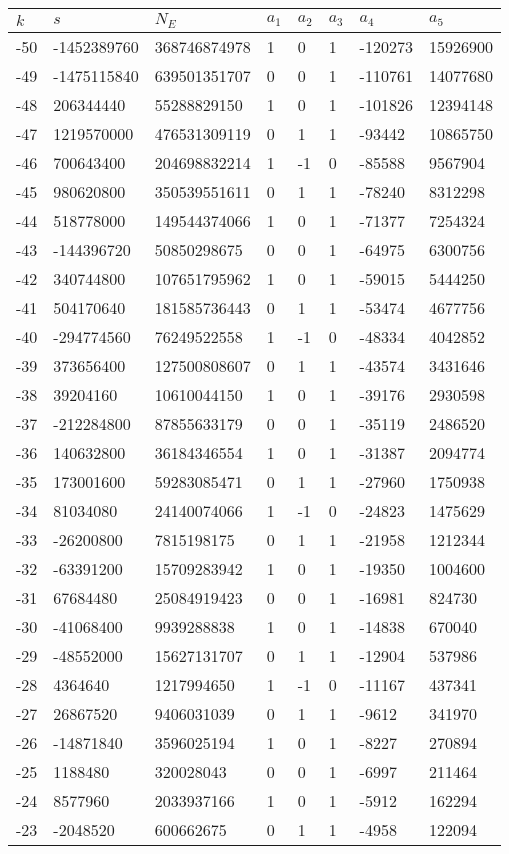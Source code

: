 \documentclass{amsart}
\begin{document}
\begin{longtable}{|l|l|l|lllll|}
\hline
$k$ & $s$ & $N_E$ & $a_1$ & $a_2$ & $a_3$ & $a_4$ & $a_5$\\
\hline
-50&-1452389760&368746874978&1&0&1&-120273&15926900\\
-49&-1475115840&639501351707&0&0&1&-110761&14077680\\
-48&206344440&55288829150&1&0&1&-101826&12394148\\
-47&1219570000&476531309119&0&1&1&-93442&10865750\\
-46&700643400&204698832214&1&-1&0&-85588&9567904\\
-45&980620800&350539551611&0&1&1&-78240&8312298\\
-44&518778000&149544374066&1&0&1&-71377&7254324\\
-43&-144396720&50850298675&0&0&1&-64975&6300756\\
-42&340744800&107651795962&1&0&1&-59015&5444250\\
-41&504170640&181585736443&0&1&1&-53474&4677756\\
-40&-294774560&76249522558&1&-1&0&-48334&4042852\\
-39&373656400&127500808607&0&1&1&-43574&3431646\\
-38&39204160&10610044150&1&0&1&-39176&2930598\\
-37&-212284800&87855633179&0&0&1&-35119&2486520\\
-36&140632800&36184346554&1&0&1&-31387&2094774\\
-35&173001600&59283085471&0&1&1&-27960&1750938\\
-34&81034080&24140074066&1&-1&0&-24823&1475629\\
-33&-26200800&7815198175&0&1&1&-21958&1212344\\
-32&-63391200&15709283942&1&0&1&-19350&1004600\\
-31&67684480&25084919423&0&0&1&-16981&824730\\
-30&-41068400&9939288838&1&0&1&-14838&670040\\
-29&-48552000&15627131707&0&1&1&-12904&537986\\
-28&4364640&1217994650&1&-1&0&-11167&437341\\
-27&26867520&9406031039&0&1&1&-9612&341970\\
-26&-14871840&3596025194&1&0&1&-8227&270894\\
-25&1188480&320028043&0&0&1&-6997&211464\\
-24&8577960&2033937166&1&0&1&-5912&162294\\
-23&-2048520&600662675&0&1&1&-4958&122094\\

\end{longtable}
\end{document}
